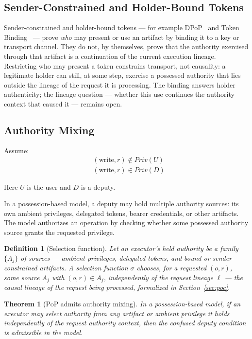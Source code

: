 \documentclass[11pt]{article}
\newtheorem{definition}{Definition}
\newtheorem{theorem}{Theorem}
\begin{document}
\subsection{Sender-Constrained and Holder-Bound Tokens}

Sender-constrained and holder-bound tokens --- for example
DPoP~\cite{fett2023dpop} and Token Binding~\cite{popov2018token} --- prove
\emph{who} may present or use an artifact by binding it to a key or transport
channel. They do not, by themselves, prove that the authority exercised through
that artifact is a continuation of the current execution lineage. Restricting who
may present a token constrains transport, not causality: a legitimate holder can
still, at some step, exercise a possessed authority that lies outside the lineage
of the request it is processing. The binding answers holder authenticity; the
lineage question --- whether this use continues the authority context that caused
it --- remains open.

\subsection{Authority Mixing}

Assume:
\begin{align}
&(\text{write},r) \notin Priv(U) \tag{H1}\\
&(\text{write},r) \in Priv(D) \tag{H2}
\end{align}

Here $U$ is the user and $D$ is a deputy.

In a possession-based model, a deputy may hold multiple authority sources:
its own ambient privileges, delegated tokens, bearer credentials, or other
artifacts. The model authorizes an operation by checking whether some possessed
authority source grants the requested privilege.

\begin{definition}[Selection function]
Let an executor's held authority be a family $\{A_j\}$ of sources --- ambient
privileges, delegated tokens, and bound or sender-constrained artifacts. A
\emph{selection function} $\sigma$ chooses, for a requested $(o,r)$, some source
$A_j$ with $(o,r) \in A_j$, independently of the request lineage $\ell$ --- the
causal lineage of the request being processed, formalized in
Section~\ref{sec:poc}.
\end{definition}

\begin{theorem}[PoP admits authority mixing]
In a possession-based model, if an executor may select authority from any
artifact or ambient privilege it holds independently of the request authority
context, then the confused deputy condition is admissible in the model.
\end{theorem}
\end{document}
